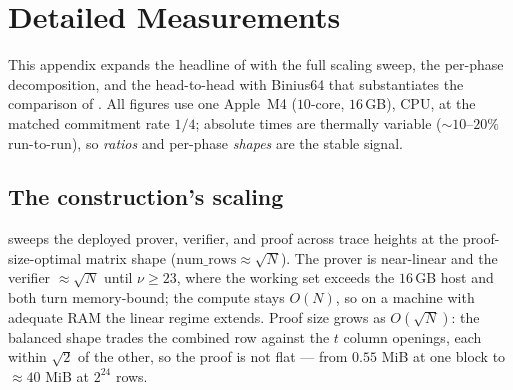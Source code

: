 \section{Detailed Measurements}
\label{app:meas}

This appendix expands the headline of  with the full scaling
sweep, the per-phase decomposition, and the head-to-head with Binius64 that
substantiates the comparison of . All figures use one Apple~M4
($10$-core, $16$\,GB), CPU, at the matched commitment rate $1/4$; absolute times
are thermally variable ($\sim$$10$--$20\%$ run-to-run), so \emph{ratios} and
per-phase \emph{shapes} are the stable signal.

\subsection{The construction's scaling}
\label{sec:app-scaling}

 sweeps the deployed prover, verifier, and proof across
trace heights at the proof-size-optimal matrix shape
($\mathrm{num\_rows}\approx\sqrt N$). The prover is near-linear and the verifier
$\approx\sqrt N$ until $\nu\ge 23$, where the working set exceeds the $16$\,GB
host and both turn memory-bound; the compute stays $O(N)$, so on a machine with
adequate RAM the linear regime extends. Proof size grows as $O(\sqrt N)$: the
balanced shape trades the combined row against the $t$ column openings, each
within $\sqrt2$ of the other, so the proof is not flat --- from $0.55$ MiB at one
block to $\approx 40$ MiB at $2^{24}$ rows.

